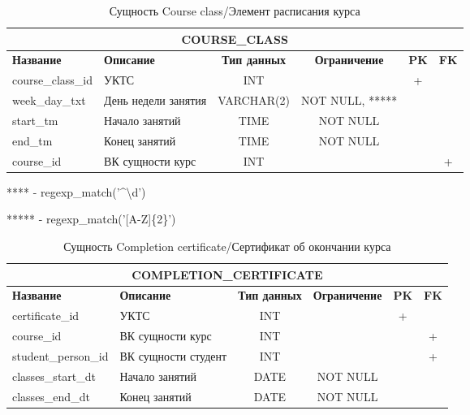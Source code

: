 \documentclass[a4paper]{article}
\begin{document}
\begin{table}[!hbt]
\begin{tabularx}{\textwidth}{|l|X|c|c|c|c|}
\hline
\multicolumn{6}{|c|}{\textbf{COURSE\_CLASS}}                                                                                      \\ \hline
\textbf{Название} & \textbf{Описание}                    & \textbf{Тип данных} & \textbf{Ограничение} & \textbf{PK} & \textbf{FK} \\ \hline
course\_class\_id & УКТС & INT                 &                      & +           &             \\ \hline
week\_day\_txt    & День недели занятия                  & VARCHAR(2)          & NOT NULL, *****             &             &             \\ \hline
start\_tm         & Начало занятий                    &               TIME      & NOT NULL             &             &             \\ \hline
end\_tm           & Конец занятий                        &     TIME               & NOT NULL             &             &             \\ \hline
course\_id        & ВК сущности курс                     & INT                 &                      &             & +           \\ \hline
\end{tabularx}
\caption{Сущность Course class/Элемент расписания курса}
\end{table}

**** - regexp\_match('\^{}\textbackslash{}d\textdollar{}')

***** - regexp\_match('[A-Z]\{2\}')

\newpage

\begin{table}[!hbt]
	\begin{tabularx}{\textwidth}{|l|X|c|c|c|c|}
		\hline
		\multicolumn{6}{|c|}{\textbf{COMPLETION\_CERTIFICATE}}                                                                              \\ \hline
		\textbf{Название}   & \textbf{Описание}                    & \textbf{Тип данных} & \textbf{Ограничение} & \textbf{PK} & \textbf{FK} \\ \hline
		certificate\_id     & УКТС & INT                 &                      & +           &             \\ \hline
		course\_id          & ВК сущности курс                     & INT                 &                      &             & +           \\ \hline
		student\_person\_id & ВК сущности студент                  & INT                 &                      &             & +           \\ \hline
		classes\_start\_dt  & Начало занятий                       & DATE        & NOT NULL             &             &             \\ \hline
		classes\_end\_dt    & Конец занятий                        & DATE        & NOT NULL             &             &             \\ \hline
	\end{tabularx}
	\caption{Сущность Completion certificate/Сертификат об окончании курса}
\end{table}
\end{document}
